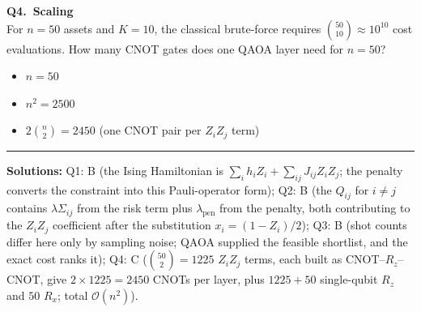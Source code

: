 \documentclass[a4paper,11pt]{article}
\begin{document}
\vspace{0.3cm}
\textbf{Q4.\ Scaling}\\
For $n=50$ assets and $K=10$, the classical brute-force requires
$\binom{50}{10} \approx 10^{10}$ cost evaluations. How many CNOT gates
does one QAOA layer need for $n = 50$?
\begin{itemize}
    \item[A)] $n = 50$
    \item[B)] $n^2 = 2500$
    \item[C)] $2\binom{n}{2} = 2450$ (one CNOT pair per $Z_iZ_j$ term)
\end{itemize}

\vspace{1cm}
\hrule
\vspace{0.2cm}
\footnotesize{\textbf{Solutions:}
Q1: B (the Ising Hamiltonian is $\sum_i h_i Z_i + \sum_{ij} J_{ij} Z_iZ_j$;
    the penalty converts the constraint into this Pauli-operator form);
Q2: B (the $Q_{ij}$ for $i\neq j$ contains $\lambda\Sigma_{ij}$ from
    the risk term plus $\lambda_\text{pen}$ from the penalty, both
    contributing to the $Z_iZ_j$ coefficient after the substitution
    $x_i=(1-Z_i)/2$);
Q3: B (shot counts differ here only by sampling noise; QAOA supplied the
    feasible shortlist, and the exact cost ranks it);
Q4: C ($\binom{50}{2} = 1225$ $Z_iZ_j$ terms, each built as
    CNOT--$R_z$--CNOT, give $2\times 1225 = 2450$ CNOTs per layer, plus
    $1225 + 50$ single-qubit $R_z$ and $50$ $R_x$; total $\mathcal{O}(n^2)$).}
\end{document}
